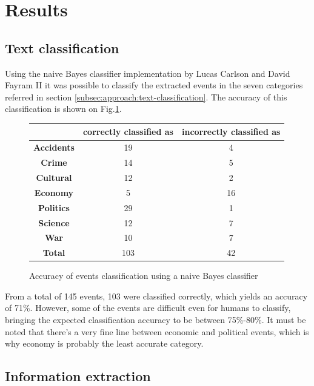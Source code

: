 \documentclass{llncs}
\begin{document}
\section{Results}

\subsection{Text classification}

Using the naive Bayes classifier implementation by Lucas Carlson and David Fayram II\cite{classifier} it was possible to classify the extracted events in the seven categories referred in section \ref{subsec:approach:text-classification}. The accuracy of this classification is shown on Fig.\ref{fig:classifier-accuracy}.

\begin{figure}[h!]

	\centering
	\begin{tabular}{|c|c|c|}
	\hline
	          & \textbf{correctly classified as} & \textbf{incorrectly classified as} \\
	\hline
	\hline
	\textbf{Accidents} & 19 & 4 \\
	\hline
	\textbf{Crime}     & 14 & 5 \\
	\hline
	\textbf{Cultural}  & 12 & 2 \\
	\hline
	\textbf{Economy}   & 5 & 16 \\
	\hline
	\textbf{Politics}  & 29 & 1 \\
	\hline
	\textbf{Science}   & 12 & 7 \\
	\hline
	\textbf{War}       & 10 & 7 \\
	\hline
	\hline
	\textbf{Total}     & 103 & 42 \\
	\hline
	\end{tabular}

	\caption{Accuracy of events classification using a naive Bayes classifier}
	\label{fig:classifier-accuracy}
\end{figure}

From a total of 145 events, 103 were classified correctly, which yields an accuracy of 71\%. However, some of the events are difficult even for humans to classify, bringing the expected classification accuracy to be between 75\%-80\%. It must be noted that there's a very fine line between economic and political events, which is why economy is probably the least accurate category.

\subsection{Information extraction}
\end{document}
